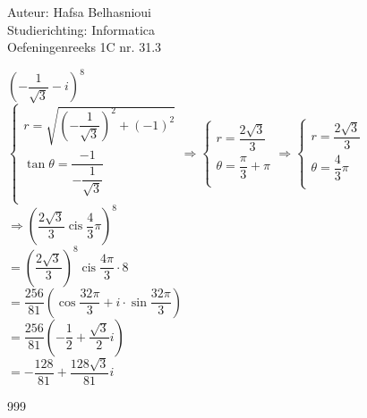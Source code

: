 \documentclass[a4paper]{article}
\newcommand{\cis}{\operatorname{cis}}
\begin{document}
\noindent \large Auteur: Hafsa Belhasnioui\\
\noindent \large Studierichting: Informatica\\
\noindent \large Oefeningenreeks 1C nr. 31.3\\

\medskip

\normalsize

$\left(-\dfrac{1}{\sqrt{3}} -i\right)^8$\\

$\left \{
\begin{array}{l}
r = \sqrt{\left(-\dfrac{1}{\sqrt{3}}\right)^2 + (-1)^2} \\
\tan \theta = \dfrac{-1}{-\dfrac{1}{\sqrt{3}}}\\ 
\end{array}
\right.
\Rightarrow \left \{
\begin{array}{l}
r = \dfrac{2\sqrt{3}}{3}\\
\theta = \dfrac{\pi}{3} + \pi \\
\end{array}
\right.
\Rightarrow \left \{
\begin{array}{l}
r = \dfrac{2\sqrt{3}}{3} \\
\theta = \dfrac{4}{3}\pi \\
\end{array}
\right.$ \\

$\Rightarrow \left(\dfrac{2\sqrt{3}}{3} \cis \dfrac{4}{3}\pi \right)^8$\\

$= \left(\dfrac{2\sqrt{3}}{3}\right)^8 \cis \dfrac{4\pi}{3} \cdot 8$\\

$= \dfrac{256}{81} \left(\cos \dfrac{32\pi}{3} + i \cdot \sin \dfrac{32\pi}{3}\right)$\\

$= \dfrac{256}{81} \left(-\dfrac{1}{2} + \dfrac{\sqrt{3}}{2}i\right)$\\

$= -\dfrac{128}{81} + \dfrac{128 \sqrt{3}}{81}i $\\


\begin{thebibliography}{999}
\end{thebibliography}
\end{document}
